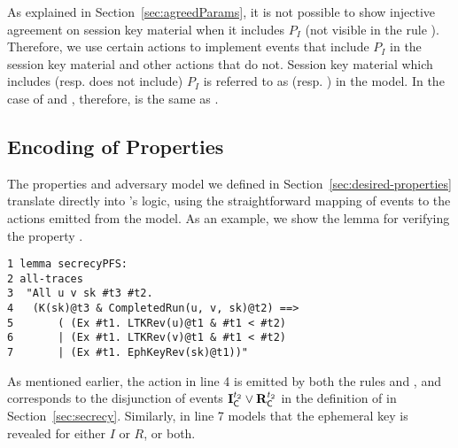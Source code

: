 As explained in Section~\ref{sec:agreedParams}, it is not possible to show
injective agreement on session key material when it includes
$P_I$ (not visible in the rule ).
%
Therefore, we use certain actions to implement events that include $P_I$ in the
session key material and other actions that do not.
%
Session key material which includes (resp. does not include) $P_I$ is referred
to as  (resp. ) in the
\mTamarin{} model.
%
In the case of \mSigSig{} and \mSigStat, therefore,  is the same as
.
%

\subsection{\mTamarin{} Encoding of Properties}
\label{sec:propertyFormalization}
The properties and adversary model we defined in
Section~\ref{sec:desired-properties} translate directly into \mTamarin's logic,
using the straightforward mapping of events to the actions emitted from the model.
%
As an example, we show the lemma for verifying the property \mPredPfs.
%
\begin{small}
\begin{verbatim}
1 lemma secrecyPFS:
2 all-traces
3  "All u v sk #t3 #t2.
4   (K(sk)@t3 & CompletedRun(u, v, sk)@t2) ==>
5       ( (Ex #t1. LTKRev(u)@t1 & #t1 < #t2)
6       | (Ex #t1. LTKRev(v)@t1 & #t1 < #t2)
7       | (Ex #t1. EphKeyRev(sk)@t1))"
\end{verbatim}
\end{small}
%
As mentioned earlier, the action  in line 4 is
emitted by both the rules  and , and corresponds
to the disjunction of events $\mathbf{I}_{\textsf{C}}^{t_2} \lor \mathbf{R}_{\textsf{C}}^{t_2}$ in the
definition of \mPredPfs{} in Section~\ref{sec:secrecy}.
%
Similarly,  in line 7 models that the ephemeral
key is revealed for either $I$ or $R$, or both.
%
